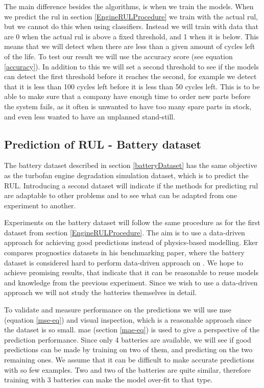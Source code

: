 \documentclass[english, a4paper]{report}
\begin{document}
{{{            The main difference besides the algorithms, is when we train the models. When we predict the \gls{rul} in section \ref{EngineRULProcedure} we train with the actual \gls{rul}, but we cannot do this when using classifiers. Instead we will train with data that are 0 when the actual \gls{rul} is above a fixed threshold, and 1 when it is below. This means that we will detect when there are less than a given amount of cycles left of the life. To test our result we will use the accuracy score (see equation \ref{accuracy}). In addition to this we will set a second threshold to see if the models can detect the first threshold before it reaches the second, for example we detect that it is less than 100 cycles left before it is less than 50 cycles left. This is to be able to make sure that a company have enough time to order new parts before the system fails, as it often is unwanted to have too many spare parts in stock, and even less wanted to have an unplanned stand-still.
        }
        
        \subsection{Prediction of RUL - Battery dataset}
        {
            The battery dataset described in section \ref{batteryDataset} has the same objective as the turbofan engine degradation simulation dataset, which is to predict the RUL. Introducing a second dataset will indicate if the methods for predicting \gls{rul} are adaptable to other problems and to see what can be adapted from one experiment to another.
            \par
            Experiments on the battery dataset will follow the same procedure as for the first dataset from section \ref{EngineRULProcedure}. The aim is to use a data-driven approach for achieving good predictions instead of physics-based modelling. Eker compares prognostics datasets in his benchmarking paper, where the battery dataset is considered hard to perform data-driven approach on \cite{PrognosticsDatasetBenchmark}. We hope to achieve promising results, that indicate that it can be reasonable to reuse models and knowledge from the previous experiment. Since we wish to use a data-driven approach we will not study the batteries themselves in detail.
            \par
            To validate and measure performance on the predictions we will use \gls{mse} (equation \ref{mse-eq}) and visual inspection, which is a reasonable approach since the dataset is so small. \Gls{mae} (section \ref{mae-eq}) is used to give a perspective of the prediction performance. Since only 4 batteries are available, we will see if good predictions can be made by training on two of them, and predicting on the two remaining ones. We assume that it can be difficult to make accurate predictions with so few examples. Two and two of the batteries are quite similar, therefore training with 3 batteries can make the model over-fit to that type. 
            
}}}
\end{document}
